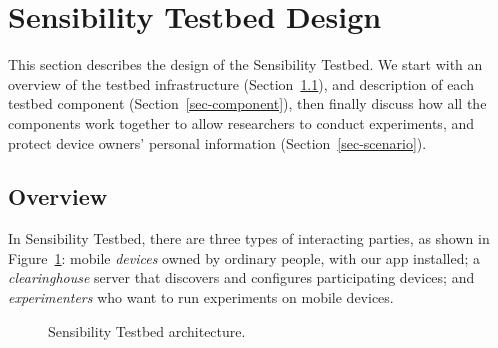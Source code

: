 \section{Sensibility Testbed Design}\label{sec-design}

This section describes the design of the Sensibility Testbed. 
We start with
an overview of the testbed infrastructure (Section~\ref{sec-overview}), 
and description of each testbed component 
(Section~\ref{sec-component}), then finally discuss how all the 
components work together to allow researchers to conduct experiments,
and protect device owners' personal information 
(Section~\ref{sec-scenario}).


\subsection{Overview}\label{sec-overview}

In Sensibility Testbed, there are three types of interacting
parties, as shown in Figure~\ref{fig-arch}: mobile \textit{devices} 
owned by ordinary people, with our app installed; a 
\textit{clearinghouse} server that discovers and configures
participating devices; and \textit{experimenters} who want to run
experiments on mobile devices. 

\begin{figure}
\caption{\small Sensibility Testbed architecture. \label{fig-arch}}
\end{figure}

